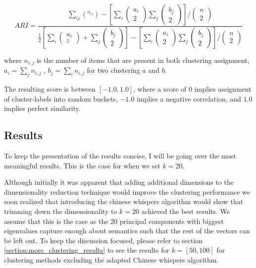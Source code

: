 \documentclass[a4paper,12pt,twoside,openright]{report}
\begin{document}
\begin{equation}
A R I=\frac{\sum_{i j}\left(^{n_{i j}}\right)-\left[\sum_{i}\left(\begin{array}{c}a_{i} \\ 2\end{array}\right) \sum_{j}\left( \begin{array}{c}b_{j} \\ 2\end{array} \right)\right] /\left(\begin{array}{c}n \\ 2\end{array}\right)}{\frac{1}{2}\left[\sum_{i}\left(\begin{array}{c}a_{i} \\ _{2}\end{array}\right)+\sum_{j}\left(\begin{array}{l}b_{j} \\ 2\end{array}\right)\right]-\left[\sum_{i}\left(\begin{array}{c} a_{i} \\ 2\end{array}\right) \sum_{j}\left(\begin{array}{l}b_{j} \\ 2\end{array}\right)\right] /\left(\begin{array}{l}n \\ 2\end{array}\right)}
\end{equation}{\label{eq:adjustedrandomindex}}

where $n_{i,j}$ is the number of items that are present in both clustering assignment, $a_i = \sum_j n_{i,j}$ , $b_j = \sum_i n_{i,j}$ for two clustering $a$ and $b$.

The resulting score is between $[-1.0, 1.0]$, where a score of $0$ implies assignment of cluster-labels into random buckets, $-1.0$ implies a negative correlation, and $1.0$ implies perfect similarity.

\subsection{Results}

To keep the presentation of the results concise, I will be going over the most meaningful results.
This is the case for when we set $k=20$.

Although initially it was apparent that adding additional dimensions to the dimensionality reduction technique would improve the clustering performance we soon realized that introducing the chinese whispers algorithm would show that trimming down the dimensionality to $k=20$ achieved the best results.
We assume that this is the case as the 20 principal components with biggest eigenvalues capture enough about semantics such that the rest of the vectors can be left out.
To keep the discussion focused, please refer to section \eqref{section:more_clustering_results} to see the results for $k=[50, 100]$ for clustering methods excluding the adapted Chinese whispers algorithm.
\end{document}

